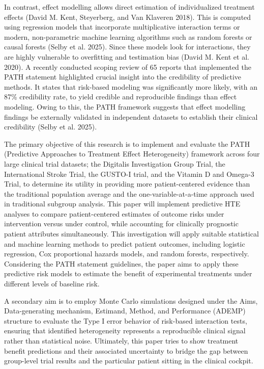 \documentclass{article}
\begin{document}
In contrast, effect modelling allows direct estimation of individualized
treatment effects (David M. Kent, Steyerberg, and Van Klaveren 2018).
This is computed using regression models that incorporate multiplicative
interaction terms or modern, non-parametric machine learning algorithms
such as random forests or causal forests (Selby et al. 2025). Since
these models look for interactions, they are highly vulnerable to
overfitting and testimation bias (David M. Kent et al. 2020). A recently
conducted scoping review of 65 reports that implemented the PATH
statement highlighted crucial insight into the credibility of predictive
methods. It states that risk-based modeling was significantly more
likely, with an 87\% credibility rate, to yield credible and
reproducible findings than effect modeling. Owing to this, the PATH
framework suggests that effect modelling findings be externally
validated in independent datasets to establish their clinical
credibility (Selby et al. 2025).

The primary objective of this research is to implement and evaluate the
PATH (Predictive Approaches to Treatment Effect Heterogeneity) framework
across four large clinical trial datasets; the Digitalis Investigation
Group Trial, the International Stroke Trial, the GUSTO-I trial, and the
Vitamin D and Omega-3 Trial, to determine its utility in providing more
patient-centered evidence than the traditional population average and
the one-variable-at-a-time approach used in traditional subgroup
analysis. This paper will implement predictive HTE analyses to compare
patient-centered estimates of outcome risks under intervention versus
under control, while accounting for clinically prognostic patient
attributes simultaneously. This investigation will apply suitable
statistical and machine learning methods to predict patient outcomes,
including logistic regression, Cox proportional hazards models, and
random forests, respectively. Considering the PATH statement guidelines,
the paper aims to apply these predictive risk models to estimate the
benefit of experimental treatments under different levels of baseline
risk.

A secondary aim is to employ Monte Carlo simulations designed under the
Aims, Data-generating mechanism, Estimand, Method, and Performance
(ADEMP) structure to evaluate the Type I error behavior of risk-based
interaction tests, ensuring that identified heterogeneity represents a
reproducible clinical signal rather than statistical noise. Ultimately,
this paper tries to show treatment benefit predictions and their
associated uncertainty to bridge the gap between group-level trial
results and the particular patient sitting in the clinical cockpit.
\end{document}
